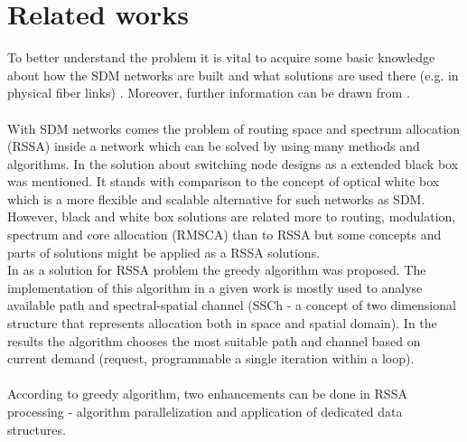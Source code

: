 \documentclass[conference]{IEEEtran}
\begin{document}
\section{Related works}
To better understand the problem it is vital to acquire some basic knowledge about how the SDM networks are built and what solutions are used there (e.g. in physical fiber links) \cite{sdm-intro}.
Moreover, further information can be drawn from \cite{rssa2} \cite{walkoartykul}.
\\ \\
With SDM networks comes the problem of routing space and spectrum allocation (RSSA) inside a network which can be solved by using many methods and algorithms. In \cite{wb-box} the solution about  switching node designs as a extended black box was mentioned. It stands with comparison to the concept of optical white box which is a more flexible and scalable alternative for such networks as SDM. However, black and white box solutions are related more to routing, modulation, spectrum and core allocation (RMSCA) than to RSSA but some concepts and parts of solutions might be applied as a RSSA solutions.
\\
In \cite{sdm-walko} as a solution for RSSA problem the greedy algorithm was proposed. The implementation of this algorithm in a given work is mostly used to analyse available path and spectral-spatial channel (SSCh - a concept of two dimensional structure that represents allocation both in space and spatial domain). In the results the algorithm chooses the most suitable path and channel based on current demand (request, programmable a single iteration within a loop).
\\ \\
According to greedy algorithm, two enhancements can be done in RSSA processing - algorithm parallelization and application of dedicated
data structures\cite{rssa}.
\
\end{document}
